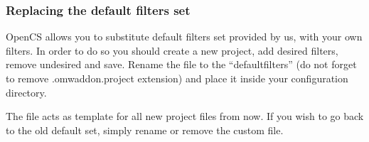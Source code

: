 \subsubsection{Replacing the default filters set}
{OpenCS} allows you to substitute default filters set provided by us, with your own filters. In order to do so you should create a new project,
add desired filters, remove undesired and save. Rename the file to the ``defaultfilters'' (do not forget to remove .omwaddon.project extension)
and place it inside your configuration directory.

The file acts as template for all new project files from now. If you wish to go back to the old default set, simply rename or remove the custom file.
